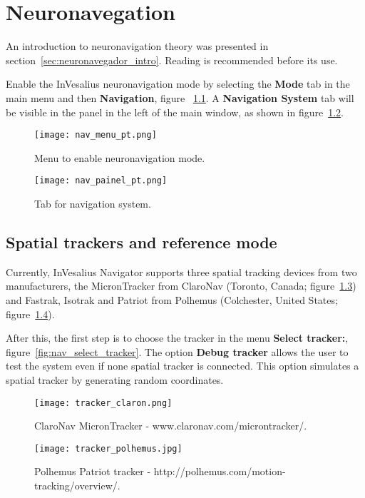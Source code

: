 \chapter{Neuronavegation}
\label{sec:neuronavegador}

An introduction to neuronavigation theory was presented in section~\ref{sec:neuronavegador_intro}. Reading is recommended before its use.

Enable the InVesalius neuronavigation mode by selecting the \textbf{Mode} tab in the main menu and
then \textbf{Navigation}, figure ~\ref{fig:nav_menu_pt}. A \textbf{Navigation System} tab will be visible in the
panel in the left of the main window, as shown in figure~\ref{fig:nav_painel_pt}.

\begin{figure}[!htb]
\centering
\texttt{[image: nav\_menu\_pt.png]}
\caption{Menu to enable neuronavigation mode.}
\label{fig:nav_menu_pt}
\end{figure}

\begin{figure}[!htb]
\centering
\texttt{[image: nav\_painel\_pt.png]}
\caption{Tab for navigation system.}
\label{fig:nav_painel_pt}
\end{figure}

\section{Spatial trackers and reference mode}

Currently, InVesalius Navigator supports three spatial tracking devices from two manufacturers, the MicronTracker
from ClaroNav (Toronto, Canada; figure~\ref{fig:tracker_claron}) and Fastrak, Isotrak and Patriot
from Polhemus (Colchester, United States; figure~\ref{fig:tracker_polhemus}).

After this, the first step is to choose the tracker in the menu \textbf{Select tracker:}, figure~\ref{fig:nav_select_tracker}.
The option \textbf{Debug tracker} allows the user to test the system even if none spatial tracker is connected.
This option simulates a spatial tracker by generating random coordinates.

\begin{figure}[!htb]
\centering
\texttt{[image: tracker\_claron.png]}
\caption{ClaroNav MicronTracker - www.claronav.com/microntracker/.}
\label{fig:tracker_claron}
\end{figure}

\begin{figure}[!htb]
\centering
\texttt{[image: tracker\_polhemus.jpg]}
\caption{Polhemus Patriot tracker - http://polhemus.com/motion-tracking/overview/.}
\label{fig:tracker_polhemus}
\end{figure}

